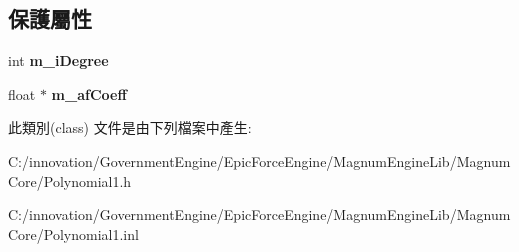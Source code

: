 \subsection*{保護屬性}
\begin{DoxyCompactItemize}
\item 
int {\bfseries m\+\_\+i\+Degree}\hypertarget{class_i_dream_sky_1_1_polynomial1_ae53d0dbae250616c273862dbb51c32c5}{}\label{class_i_dream_sky_1_1_polynomial1_ae53d0dbae250616c273862dbb51c32c5}

\item 
float $\ast$ {\bfseries m\+\_\+af\+Coeff}\hypertarget{class_i_dream_sky_1_1_polynomial1_abe1d23756afe5737c6132add3ec3cc09}{}\label{class_i_dream_sky_1_1_polynomial1_abe1d23756afe5737c6132add3ec3cc09}

\end{DoxyCompactItemize}


此類別(class) 文件是由下列檔案中產生\+:\begin{DoxyCompactItemize}
\item 
C\+:/innovation/\+Government\+Engine/\+Epic\+Force\+Engine/\+Magnum\+Engine\+Lib/\+Magnum\+Core/Polynomial1.\+h\item 
C\+:/innovation/\+Government\+Engine/\+Epic\+Force\+Engine/\+Magnum\+Engine\+Lib/\+Magnum\+Core/Polynomial1.\+inl\end{DoxyCompactItemize}
